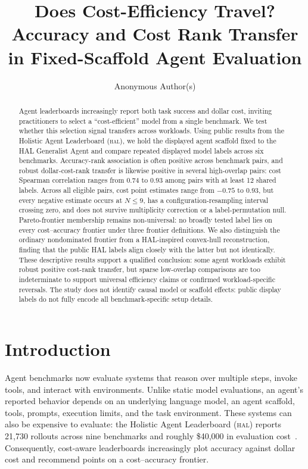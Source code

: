 \documentclass{article}
\title{Does Cost-Efficiency Travel? Accuracy and Cost Rank Transfer in Fixed-Scaffold Agent Evaluation}
\author{Anonymous Author(s)}
\newcommand{\hal}{\textsc{hal}}
\begin{document}
\maketitle

\begin{abstract}
Agent leaderboards increasingly report both task success and dollar cost, inviting practitioners to select a ``cost-efficient'' model from a single benchmark. We test whether this selection signal transfers across workloads. Using public results from the Holistic Agent Leaderboard (\hal), we hold the displayed agent scaffold fixed to the HAL Generalist Agent and compare repeated displayed model labels across six benchmarks. Accuracy-rank association is often positive across benchmark pairs, and robust dollar-cost-rank transfer is likewise positive in several high-overlap pairs: cost Spearman correlation ranges from $0.74$ to $0.93$ among pairs with at least 12 shared labels. Across all eligible pairs, cost point estimates range from $-0.75$ to $0.93$, but every negative estimate occurs at $N\leq9$, has a configuration-resampling interval crossing zero, and does not survive multiplicity correction or a label-permutation null. Pareto-frontier membership remains non-universal: no broadly tested label lies on every cost--accuracy frontier under three frontier definitions. We also distinguish the ordinary nondominated frontier from a HAL-inspired convex-hull reconstruction, finding that the public HAL labels align closely with the latter but not identically. These descriptive results support a qualified conclusion: some agent workloads exhibit robust positive cost-rank transfer, but sparse low-overlap comparisons are too indeterminate to support universal efficiency claims or confirmed workload-specific reversals. The study does not identify causal model or scaffold effects: public display labels do not fully encode all benchmark-specific setup details.
\end{abstract}

\section{Introduction}

Agent benchmarks now evaluate systems that reason over multiple steps, invoke tools, and interact with environments. Unlike static model evaluations, an agent's reported behavior depends on an underlying language model, an agent scaffold, tools, prompts, execution limits, and the task environment. These systems can also be expensive to evaluate: the Holistic Agent Leaderboard (\hal) reports 21,730 rollouts across nine benchmarks and roughly \$40,000 in evaluation cost~\citep{kapoor2026hal}. Consequently, cost-aware leaderboards increasingly plot accuracy against dollar cost and recommend points on a cost--accuracy frontier.
\end{document}
